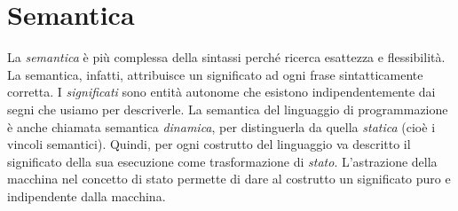 \documentclass[a4paper,oneside,titlepage]{book}
\begin{document}
\section{Semantica}
La \textit{semantica} è più complessa della sintassi perché ricerca esattezza e flessibilità. La semantica, infatti, attribuisce un significato ad ogni frase sintatticamente corretta. I \textit{significati} sono entità autonome che esistono indipendentemente dai segni che usiamo per descriverle. La semantica del linguaggio di programmazione è anche chiamata semantica \textit{dinamica}, per distinguerla da quella \textit{statica} (cioè i vincoli semantici).  Quindi, per ogni costrutto del linguaggio va descritto il significato della sua esecuzione come trasformazione di \textit{stato}. L'astrazione della macchina nel concetto di stato permette di dare al costrutto un significato puro e indipendente dalla macchina.
\end{document}
